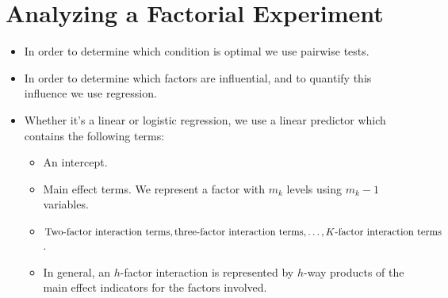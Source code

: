 \section{Analyzing a Factorial Experiment}
\begin{itemize}
      \item In order to determine which condition is optimal we use pairwise tests.
      \item In order to determine which factors are influential, and to quantify this influence we use regression.
      \item Whether it's a linear or logistic regression, we use a linear predictor which contains the following terms:
            \begin{itemize}
                  \item An intercept.
                  \item Main effect terms. We represent a factor with $ m_k $ levels using $ m_k-1 $ variables.
                  \item $ \text{Two-factor interaction terms}, \text{three-factor interaction terms},\ldots , \text{$ K $-factor interaction terms} $.
                  \item In general, an $ h $-factor interaction is represented by $ h $-way products of the main effect indicators for the factors involved.
            \end{itemize}
\end{itemize}
